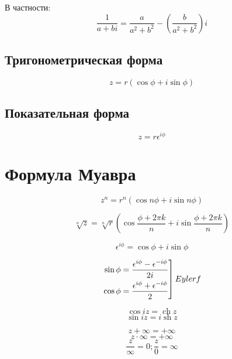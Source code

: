 \documentclass[oneside,final,14pt]{extreport}
\begin{document}
В частности:
\[\frac{1}{a+bi}=\frac{a}{a^2+b^2}-\left(\frac{b}{a^2+b^2}\right)i\]

\subsection*{Тригонометрическая форма}
\[z = r(\cos \phi + i \sin \phi )  \]

\subsection*{Показательная форма}
\[z = r\epsilon^{i \phi}\]

\section*{Формула Муавра}
\[z^n = r^n (\cos n \phi + i \sin n \phi)  \]

\[\sqrt[n]{z} = \sqrt[n]{r} \left( \cos \frac{\phi + 2 \pi k}{n} + i \sin \frac{\phi + 2 \pi k}{n} \right) \]

\[\epsilon^{i \phi} = \cos \phi + i \sin \phi\]


\begin{equation*}
\left.
\begin{aligned}
\sin \phi &= \frac{\epsilon^{i \phi} - \epsilon^{-i \phi}}{2 i} \\
\cos \phi &= \frac{\epsilon^{i \phi} + \epsilon^{-i \phi}}{2}
\end{aligned}
 \right]  \normalfont{Eyler} f
\end{equation*}

\[ \cos i z = \operatorname{ch} z \]
\[ \sin i z = i \operatorname{sh} z \]

\[z + \infty = +\infty \]\[z \cdot \infty = +\infty \]
\[ \left. \frac{z}{\infty} = 0; \right. \frac{z}{0} = \infty \]
\end{document}
